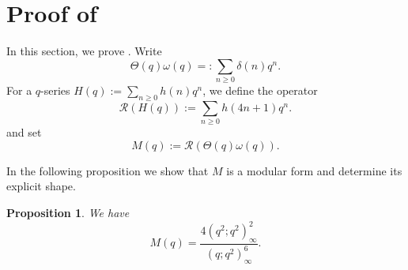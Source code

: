 \documentclass[12pt,reqno]{amsart}
\renewcommand{\d}{{\delta}}
\renewcommand{\o}{{\omega}}
\renewcommand{\(}{\left\(}
\renewcommand{\)}{\right\)}
\newcommand{\os}[2]{\overset{#1}{#2}}
\numberwithin{equation}{section}
\theoremstyle{plain}
\newtheorem{proposition}[theorem]{Proposition}
\theoremstyle{definition}
\numberwithin{equation}{section}
\renewcommand{\pmod}[1]{\ \left( \mathrm{mod} \, #1 \right)}
\begin{document}


\section{Proof of }\label{sec4}

In this section, we prove . Write 
\[
\Theta(q)\o(q)=:\sum_{n\ge 0}\d(n)q^n.
\]
 For a $q$-series $H(q):=\sum_{n\ge 0}h(n) q^n$, we define the operator 
\[
\mathcal{R}\left(H(q)\right):=\sum_{n\ge 0}h\!\left(4n+1\right) q^n.
\] and set 
\[
M(q):=\mathcal{R}\left(\Theta(q)\o(q)\right).
\]


In the following proposition we show that $M$ is a modular form and determine its explicit shape.


\begin{proposition}\label{eq:main-id}
	We have 
	\begin{equation*}
	M(q)
	=
	\frac{4\left(q^2;q^2\right)^2_\infty}{\left(q;q^2\right)^6_\infty}.
	\end{equation*}
\end{proposition}
\end{document}
